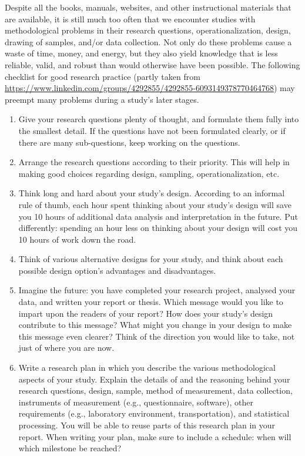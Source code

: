 \documentclass[
]{book}
\begin{document}
Despite all the books, manuals, websites, and other instructional materials that are available, it is still much too often that we encounter studies with methodological problems in their research questions, operationalization, design, drawing of samples, and/or data collection. Not only do these problems cause a waste of time, money, and energy, but they also yield knowledge that is less reliable, valid, and robust than would otherwise have been possible. The following checklist for good research practice (partly taken from \url{https://www.linkedin.com/groups/4292855/4292855-6093149378770464768}) may preempt many problems during a study's later stages.

\begin{enumerate}
\def\labelenumi{\arabic{enumi}.}
\item
  Give your research questions plenty of thought, and formulate them fully into the smallest detail. If the questions have not been formulated clearly, or if there are many sub-questions, keep working on the questions.
\item
  Arrange the research questions according to their priority. This will help in making good choices regarding design, sampling, operationalization, etc.
\item
  Think long and hard about your study's design. According to an informal rule of thumb, each hour spent thinking about your study's design will save you 10 hours of additional data analysis and interpretation in the future. Put differently: spending an hour less on thinking about your design will cost you 10 hours of work down the road.
\item
  Think of various alternative designs for your study, and think about each possible design option's advantages and disadvantages.
\item
  Imagine the future: you have completed your research project, analysed your data, and written your report or thesis. Which message would you like to impart upon the readers of your report? How does your study's design contribute to this message? What might you change in your design to make this message even clearer? Think of the direction you would like to take, not just of where you are now.
\item
  Write a research plan in which you describe the various methodological aspects of your study. Explain the details of and the reasoning behind your research questions, design, sample, method of measurement, data collection, instruments of measurement (e.g., questionnaire, software), other requirements (e.g., laboratory environment, transportation), and statistical processing. You will be able to reuse parts of this research plan in your report. When writing your plan, make sure to include a schedule: when will which milestone be reached?

\end{enumerate}
\end{document}
